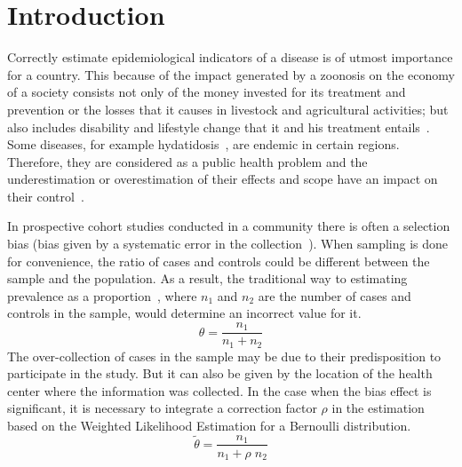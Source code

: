 \documentclass[10pt,letterpaper]{article}
\begin{document}
\section*{Introduction}

Correctly estimate epidemiological indicators of a disease is of utmost importance for a country. This because of the impact generated by a zoonosis on the economy of a society consists not only of the money invested for its treatment and prevention or the losses that it causes in livestock and agricultural activities; but also includes disability and lifestyle change that it and his treatment entails~\cite{shaw2017dalys}. Some diseases, for example hydatidosis~\cite{santivanez2010factores}, are endemic in certain regions. Therefore, they are considered as a public health problem and the underestimation or overestimation of their effects and scope have an impact on their control~\cite{moro2011economic}.


In prospective cohort studies conducted in a community there is often a selection bias (bias given by a systematic error in the collection~\cite{celentano2019gordis}). When sampling is done for convenience, the ratio of cases and controls could be different between the sample and the population. As a result, the traditional way to estimating  prevalence as a proportion~\cite{scheaffer2006elementary}, where $n_1$ and $n_2$ are the number of cases and controls in the sample, would determine an incorrect value for it.
\begin{equation}
    \hat{\theta} = \frac{n_1}{n_1 +  n_2}
\end{equation}
The over-collection of cases in the sample may be due to their predisposition to participate in the study. But it can also be given by the location of the health center where the information was collected.
In the case when the bias effect is significant, it is necessary to integrate a correction factor $\rho$ in the estimation based on the Weighted Likelihood Estimation for a Bernoulli distribution.
\begin{equation}\label{WLE}
    \tilde{\theta} = \frac{n_1}{n_1 + \rho \; n_2}
\end{equation}
\end{document}
